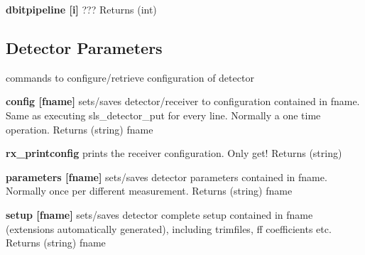\begin{DoxyItemize}
\item {\bfseries dbitpipeline \mbox{[}i\mbox{]}} ??? {\ttfamily Returns} {\ttfamily }(int)
\end{DoxyItemize}\hypertarget{config_configsettings}{}\subsection{Detector Parameters}\label{config_configsettings}
commands to configure/retrieve configuration of detector


\begin{DoxyItemize}
\item {\bfseries config \mbox{[}fname\mbox{]}} sets/saves detector/receiver to configuration contained in fname. Same as executing sls\_\-detector\_\-put for every line. Normally a one time operation. {\ttfamily Returns} {\ttfamily }(string) fname
\end{DoxyItemize}


\begin{DoxyItemize}
\item {\bfseries rx\_\-printconfig} prints the receiver configuration. Only get! {\ttfamily Returns} {\ttfamily }(string)
\end{DoxyItemize}


\begin{DoxyItemize}
\item {\bfseries parameters \mbox{[}fname\mbox{]}} sets/saves detector parameters contained in fname. Normally once per different measurement. {\ttfamily Returns} {\ttfamily }(string) fname
\end{DoxyItemize}


\begin{DoxyItemize}
\item {\bfseries setup \mbox{[}fname\mbox{]}} sets/saves detector complete setup contained in fname (extensions automatically generated), including trimfiles, ff coefficients etc. {\ttfamily Returns} {\ttfamily }(string) fname 
\end{DoxyItemize}